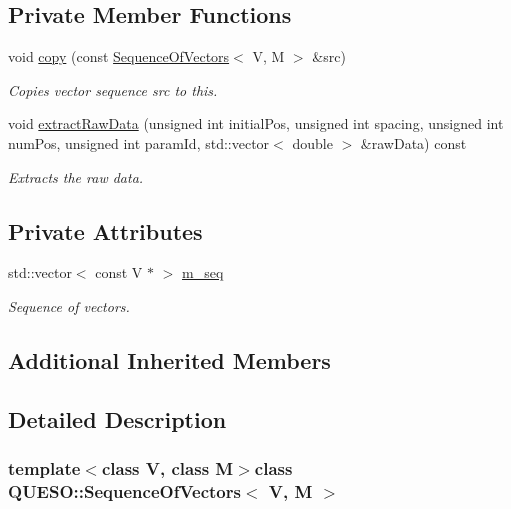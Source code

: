 \subsection*{Private Member Functions}
\begin{DoxyCompactItemize}
\item 
void \hyperlink{class_q_u_e_s_o_1_1_sequence_of_vectors_a00d63e1e5dbece07d596da43fcc0ac6a}{copy} (const \hyperlink{class_q_u_e_s_o_1_1_sequence_of_vectors}{Sequence\-Of\-Vectors}$<$ V, M $>$ \&src)
\begin{DoxyCompactList}\small\item\em Copies vector sequence {\ttfamily src} to {\ttfamily this}. \end{DoxyCompactList}\item 
void \hyperlink{class_q_u_e_s_o_1_1_sequence_of_vectors_a217e1f9a9d1a6fe8117c25d37fcbae23}{extract\-Raw\-Data} (unsigned int initial\-Pos, unsigned int spacing, unsigned int num\-Pos, unsigned int param\-Id, std\-::vector$<$ double $>$ \&raw\-Data) const 
\begin{DoxyCompactList}\small\item\em Extracts the raw data. \end{DoxyCompactList}\end{DoxyCompactItemize}
\subsection*{Private Attributes}
\begin{DoxyCompactItemize}
\item 
std\-::vector$<$ const V $\ast$ $>$ \hyperlink{class_q_u_e_s_o_1_1_sequence_of_vectors_ae83e7c53439265667809256d0d302e5b}{m\-\_\-seq}
\begin{DoxyCompactList}\small\item\em Sequence of vectors. \end{DoxyCompactList}\end{DoxyCompactItemize}
\subsection*{Additional Inherited Members}


\subsection{Detailed Description}
\subsubsection*{template$<$class V, class M$>$class Q\-U\-E\-S\-O\-::\-Sequence\-Of\-Vectors$<$ V, M $>$}

